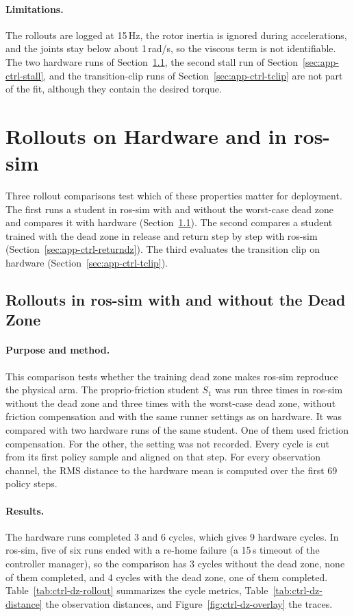 \paragraph{Limitations.} The rollouts are logged at 15\,Hz, the rotor inertia is ignored during accelerations, and the joints stay below about 1\,rad/s, so the viscous term is not identifiable. The two hardware runs of Section~\ref{sec:app-ctrl-rollout}, the second stall run of Section~\ref{sec:app-ctrl-stall}, and the transition-clip runs of Section~\ref{sec:app-ctrl-tclip} are not part of the fit, although they contain the desired torque.

\section{Rollouts on Hardware and in ros-sim}\label{sec:app-ctrl-rollouts}

Three rollout comparisons test which of these properties matter for deployment. The first runs a student in ros-sim with and without the worst-case dead zone and compares it with hardware (Section~\ref{sec:app-ctrl-rollout}). The second compares a student trained with the dead zone in release and return step by step with ros-sim (Section~\ref{sec:app-ctrl-returndz}). The third evaluates the transition clip on hardware (Section~\ref{sec:app-ctrl-tclip}).

\subsection{Rollouts in ros-sim with and without the Dead Zone}\label{sec:app-ctrl-rollout}

\paragraph{Purpose and method.} This comparison tests whether the training dead zone makes ros-sim reproduce the physical arm. The proprio-friction student $S_1$ was run three times in ros-sim without the dead zone and three times with the worst-case dead zone, without friction compensation and with the same runner settings as on hardware. It was compared with two hardware runs of the same student. One of them used friction compensation. For the other, the setting was not recorded. Every cycle is cut from its first policy sample and aligned on that step. For every observation channel, the RMS distance to the hardware mean is computed over the first 69 policy steps.

\paragraph{Results.} The hardware runs completed 3 and 6 cycles, which gives 9 hardware cycles. In ros-sim, five of six runs ended with a re-home failure (a 15\,s timeout of the controller manager), so the comparison has 3 cycles without the dead zone, none of them completed, and 4 cycles with the dead zone, one of them completed. Table~\ref{tab:ctrl-dz-rollout} summarizes the cycle metrics, Table~\ref{tab:ctrl-dz-distance} the observation distances, and Figure~\ref{fig:ctrl-dz-overlay} the traces.

